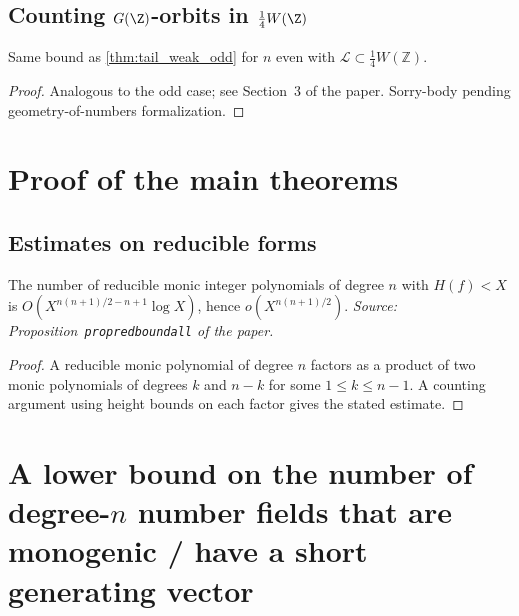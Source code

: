 \subsection{Counting $G(\Z)$-orbits in $\frac14W(\Z)$}

\begin{theorem}
  \label{thm:tail_weak_even}
  Same bound as \cref{thm:tail_weak_odd} for \(n\) even with
  \(\mathcal{L}\subset\tfrac14 W(\mathbb{Z})\).
\end{theorem}
\begin{proof}
  Analogous to the odd case; see Section~3 of the paper.  Sorry-body
  pending geometry-of-numbers formalization.
\end{proof}

\section{Proof of the main theorems}

\subsection{Estimates on reducible forms}

\begin{lemma}
  \label{lem:reducible_bound}
  The number of reducible monic integer polynomials of degree \(n\)
  with \(H(f)<X\) is \(O\!\left(X^{n(n+1)/2-n+1}\log X\right)\), hence
  \(o\!\left(X^{n(n+1)/2}\right)\).
  \textit{Source: Proposition~\texttt{propredboundall} of the paper.}
\end{lemma}
\begin{proof}
  A reducible monic polynomial of degree \(n\) factors as a product
  of two monic polynomials of degrees \(k\) and \(n-k\) for some
  \(1\leq k\leq n-1\).  A counting argument using height bounds on
  each factor gives the stated estimate.
\end{proof}

\section{A lower bound on the number of degree-$n$ number fields that are monogenic / have a short generating vector}


